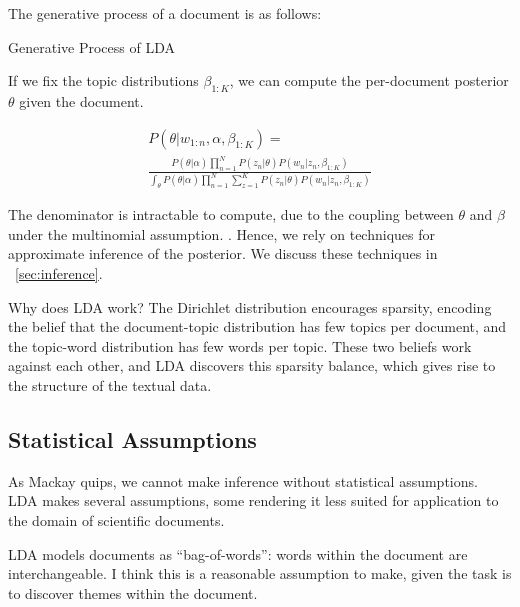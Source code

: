 \documentclass[letterpaper]{article}
\begin{document}
The generative process of a document is as follows:

\begin{algorithm}
  \caption{Generative Process of LDA}\label{alg:LDA}
  \begin{algorithmic}[1]
    \EndFor
    \EndFor
  \end{algorithmic}
\end{algorithm}

If we fix the topic distributions $\beta_{1:K}$, we can compute the
per-document posterior $\theta$ given the document.

\begin{multline}
  P(\theta | w_{1:n}, \alpha, \beta_{1:K}) = \\ \frac{P(\theta |
    \alpha)\prod_{n=1}^{N} P(z_n | \theta) P(w_n | z_n,
    \beta_{1:K})}{\int_\theta P(\theta | \alpha) \prod_{n=1}^N
    \sum_{z=1}^K P(z_n | \theta) P(w_n | z_n, \beta_{1:K})}
\end{multline}


The denominator is intractable to compute, due to the coupling
between $\theta$ and $\beta$ under the multinomial assumption.
\cite{blei2003latent}. Hence, we rely on techniques for approximate
inference of the posterior. We discuss these techniques in
~\autoref{sec:inference}.

Why does LDA work? The Dirichlet distribution encourages sparsity,
encoding the belief that the document-topic distribution has few
topics per document, and the topic-word distribution has few words per
topic. These two beliefs work against each other, and LDA discovers
this sparsity balance, which gives rise to the structure of the
textual data.

\subsection{Statistical Assumptions}
\label{subsec:statistical-assumptions}
As Mackay quips, we cannot make inference without statistical
assumptions. LDA makes several assumptions, some rendering it less
suited for application to the domain of scientific documents.

LDA models documents as ``bag-of-words'': words within the document
are interchangeable. \cite{blei2003latent} I think this is a
reasonable assumption to make, given the task is to discover themes
within the document.
\end{document}
